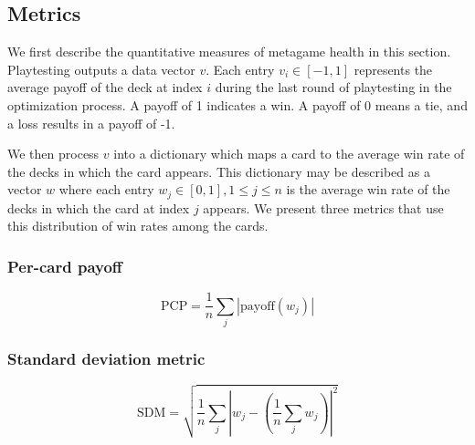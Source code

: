 

\subsection{Metrics}

We first describe the quantitative measures of metagame health 
in this section. Playtesting outputs a data vector $v$.
Each entry $v_i \in [-1, 1]$ represents the average payoff of
the deck at index $i$ during the last round of playtesting in
the optimization process. A payoff of 1 indicates a win. A
payoff of 0 means a tie, and a loss results in a payoff of -1.

We then process $v$ into a dictionary which maps a card to the
average win rate of the decks in which the card appears. This
dictionary may be described as a vector $w$ where each entry 
$w_j \in [0, 1], 1 \leq j \leq n$ is the average win rate of the decks in which
the card at index $j$ appears. We present three metrics that 
use this distribution of win rates among the cards.


\subsubsection{Per-card payoff}

\begin{equation}
	\mathrm{PCP} = \frac{1}{n} \sum_j \left|\mathrm{payoff}(w_j)\right|
\end{equation}

\subsubsection{Standard deviation metric}

\begin{equation}
	\mathrm{SDM} = \sqrt{\frac{1}{n} \sum_j \left|w_j - \left(\frac{1}{n}\sum_j w_j\right)\right|^2}
\end{equation}


